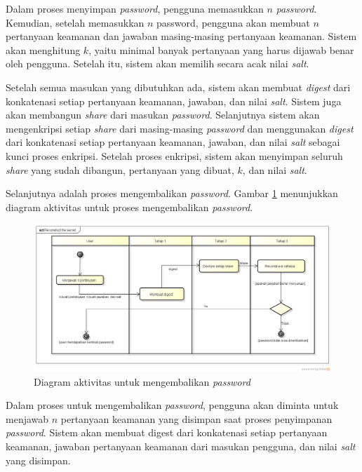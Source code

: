 Dalam proses menyimpan \textit{password}, pengguna memasukkan $n$ \textit{password}. Kemudian, setelah memasukkan $n$ password, pengguna akan membuat $n$ pertanyaan keamanan dan jawaban masing-masing pertanyaan keamanan. Sistem akan menghitung $k$, yaitu minimal banyak pertanyaan yang harus dijawab benar oleh pengguna. Setelah itu, sistem akan memilih secara acak nilai \textit{salt}.

Setelah semua masukan yang dibutuhkan ada, sistem akan membuat \textit{digest} dari konkatenasi setiap pertanyaan keamanan, jawaban, dan nilai \textit{salt}. Sistem juga akan membangun \textit{share} dari masukan \textit{password}. Selanjutnya sistem akan mengenkripsi setiap \textit{share} dari masing-masing \textit{password} dan menggunakan \textit{digest} dari konkatenasi setiap pertanyaan keamanan, jawaban, dan nilai \textit{salt} sebagai kunci proses enkripsi. Setelah proses enkripsi, sistem akan menyimpan seluruh \textit{share} yang sudah dibangun, pertanyaan yang dibuat, $k$, dan nilai \textit{salt}.

Selanjutnya adalah proses mengembalikan \textit{password}. Gambar \ref{fig:activity2} menunjukkan diagram aktivitas untuk proses mengembalikan \textit{password}.

\begin{figure}[H]
	\centerline{\includegraphics[scale=0.35]{Gambar/reconstruct-secret}}
	\caption{Diagram aktivitas untuk mengembalikan \textit{password}}\label{fig:activity2}
\end{figure}

Dalam proses untuk mengembalikan \textit{password}, pengguna akan diminta untuk menjawab $n$ pertanyaan keamanan yang disimpan saat proses penyimpanan \textit{password}. Sistem akan membuat digest dari konkatenasi setiap pertanyaan keamanan, jawaban pertanyaan keamanan dari masukan pengguna, dan nilai \textit{salt} yang disimpan.

